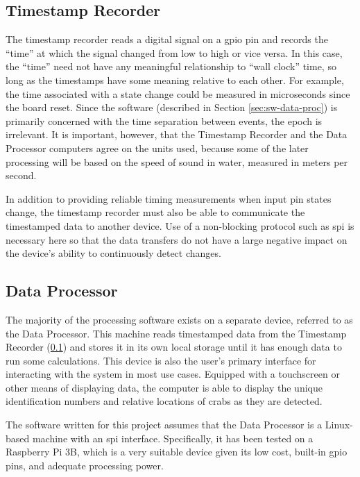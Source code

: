 \documentclass[12pt]{article}
\begin{document}
\subsection{Timestamp Recorder}\label{sec:ts-rec}

The timestamp recorder reads a digital signal on a \gls{gpio} pin and records
the ``time'' at which the signal changed from low to high or vice versa.
In this case, the ``time'' need not have any meaningful relationship to
``wall clock'' time, so long
as the timestamps have some meaning relative to each other.
For example, the time associated with a state change could be measured in
microseconds since the board reset.
Since the software (described in Section \ref{sec:sw-data-proc}) is primarily
concerned with the time separation between events, the epoch is irrelevant.
It is important, however, that the Timestamp Recorder and the Data Processor
computers agree on the units used, because some of the later processing will be
based on the speed of sound in water, measured in meters per second.

In addition to providing reliable timing measurements when input pin states
change, the timestamp recorder must also be able to communicate the timestamped
data to another device.
Use of a non-blocking protocol such as \gls{spi} is
necessary here so that the data transfers do not have a large negative impact
on the device's ability to continuously detect changes.

\subsection{Data Processor}\label{sec:data-processor}

The majority of the processing software exists on a separate device, referred
to as the Data Processor.
This machine reads timestamped data from the
Timestamp Recorder (\ref{sec:ts-rec}) and stores it in its own local storage
until it has enough data to run some calculations.
This device is also the user's primary interface for interacting with the
system in most use cases.
Equipped with a touchscreen or other means of displaying data, the computer is
able to display the unique identification numbers and relative locations of
crabs as they are detected.

The software written for this project assumes that the Data Processor is a
Linux-based machine with an \gls{spi} interface.
Specifically, it has been tested on a Raspberry Pi 3B, which is a very
suitable device given its low cost, built-in \gls{gpio} pins, and adequate
processing power.
\end{document}
